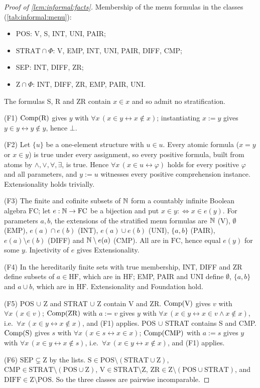 \begin{proof}[Proof of \cref{lem:informal:facts}]
Membership of the menu formulas in the classes (\cref{tab:informal:menu}):
\begin{itemize}
\item POS: V, S, INT, UNI, PAIR;
\item $\mathrm{STRAT}\cap\Phi$: V, EMP, INT, UNI, PAIR, DIFF, CMP;
\item SEP: INT, DIFF, ZR;
\item $\mathrm Z\cap\Phi$: INT, DIFF, ZR, EMP, PAIR, UNI.
\end{itemize}
The formulas S, R and ZR contain $x\in x$ and so admit no stratification.

(F1) $\mathrm{Comp}(\mathrm R)$ gives $y$ with $\forall x\,(x\in y\leftrightarrow x\notin x)$; instantiating $x:=y$ gives $y\in y\leftrightarrow y\notin y$, hence $\bot$.

(F2) Let $\{u\}$ be a one-element structure with $u\in u$. Every atomic formula ($x=y$ or $x\in y$) is true under every assignment, so every positive formula, built from atoms by $\wedge,\vee,\forall,\exists$, is true. Hence $\forall x\,(x\in u\leftrightarrow\varphi)$ holds for every positive $\varphi$ and all parameters, and $y:=u$ witnesses every positive comprehension instance. Extensionality holds trivially.

(F3) The finite and cofinite subsets of $\mathbb{N}$ form a countably infinite Boolean algebra $\mathrm{FC}$; let $e:\mathbb{N}\to\mathrm{FC}$ be a bijection and put $x\in y:\iff x\in e(y)$. For parameters $a,b$, the extensions of the stratified menu formulas are $\mathbb{N}$ (V), $\emptyset$ (EMP), $e(a)\cap e(b)$ (INT), $e(a)\cup e(b)$ (UNI), $\{a,b\}$ (PAIR), $e(a)\setminus e(b)$ (DIFF) and $\mathbb{N}\setminus e(a)$ (CMP). All are in $\mathrm{FC}$, hence equal $e(y)$ for some $y$. Injectivity of $e$ gives Extensionality.

(F4) In the hereditarily finite sets with true membership, INT, DIFF and ZR define subsets of $a\in\mathrm{HF}$, which are in $\mathrm{HF}$; EMP, PAIR and UNI define $\emptyset$, $\{a,b\}$ and $a\cup b$, which are in $\mathrm{HF}$. Extensionality and Foundation hold.

(F5) POS $\cup$ Z and STRAT $\cup$ Z contain V and ZR. $\mathrm{Comp}(\mathrm V)$ gives $v$ with $\forall x\,(x\in v)$; $\mathrm{Comp}(\mathrm{ZR})$ with $a:=v$ gives $y$ with $\forall x\,(x\in y\leftrightarrow x\in v\wedge x\notin x)$, i.e.\ $\forall x\,(x\in y\leftrightarrow x\notin x)$, and (F1) applies. POS $\cup$ STRAT contains S and CMP. $\mathrm{Comp}(\mathrm S)$ gives $s$ with $\forall x\,(x\in s\leftrightarrow x\in x)$; $\mathrm{Comp}(\mathrm{CMP})$ with $a:=s$ gives $y$ with $\forall x\,(x\in y\leftrightarrow x\notin s)$, i.e.\ $\forall x\,(x\in y\leftrightarrow x\notin x)$, and (F1) applies.

(F6) $\mathrm{SEP}\subsetneq\mathrm Z$ by the lists. $\mathrm S\in\mathrm{POS}\setminus(\mathrm{STRAT}\cup\mathrm Z)$, $\mathrm{CMP}\in\mathrm{STRAT}\setminus(\mathrm{POS}\cup\mathrm Z)$, $\mathrm V\in\mathrm{STRAT}\setminus\mathrm Z$, $\mathrm{ZR}\in\mathrm Z\setminus(\mathrm{POS}\cup\mathrm{STRAT})$, and $\mathrm{DIFF}\in\mathrm Z\setminus\mathrm{POS}$. So the three classes are pairwise incomparable.
\end{proof}

